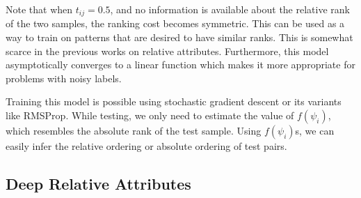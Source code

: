 Note that when $t_{ij} = 0.5$, and no information is available about the relative rank of the two samples, the ranking cost becomes symmetric. This can be used as a way to train on patterns that are desired to have similar ranks. This is somewhat scarce in the previous works on relative attributes.
Furthermore, this model asymptotically converges to a linear function which makes it more appropriate for problems with noisy labels. %

Training this model is possible using stochastic gradient descent or its variants like RMSProp.%
While testing, we only need to estimate the value of $f(\psi_i)$, which resembles the absolute rank of the test sample. Using $f(\psi_i)$s, we can easily infer the relative ordering or absolute ordering of test pairs.


\subsection{Deep Relative Attributes}\label{sec3.2}


